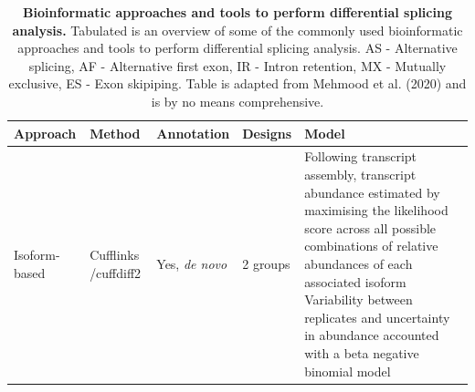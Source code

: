 \begin{landscape}
	\small %
	\setlength\tabcolsep{2pt} %
	\renewcommand{\arraystretch}{1}
\begin{longtable}[c]{p{2.5cm}p{2cm}p{2cm}p{2.5cm}p{17cm}}
	\caption[Bioinformatic approaches and tools to perform differential splicing analysis]%
	{\textbf{Bioinformatic approaches and tools to perform differential splicing analysis.} Tabulated is an overview of some of the commonly used bioinformatic approaches and tools to perform differential splicing analysis. \newline AS - Alternative splicing, AF - Alternative first exon, IR - Intron retention, MX - Mutually exclusive, ES - Exon skipiping. Table is adapted from Mehmood et al. (2020)\cite{Mehmood2020} and is by no means comprehensive. }
	\label{tab: rnaseq_diffsplicing}\\
	\toprule
	Approach &
	Method &
	Annotation &
	Designs &
	Model \\ \midrule
	\multirow{2}{*}{Isoform-based} &
	Cufflinks \newline /cuffdiff2 &
	Yes, \textit{de novo} &
	2 groups &
	\tabitem Following transcript assembly, transcript abundance estimated by maximising the likelihood score across all possible combinations of relative abundances of each associated isoform \newline 
	\tabitem Variability between replicates and uncertainty in abundance accounted with a beta negative binomial model \\ 
	

\end{longtable}
\end{landscape}
